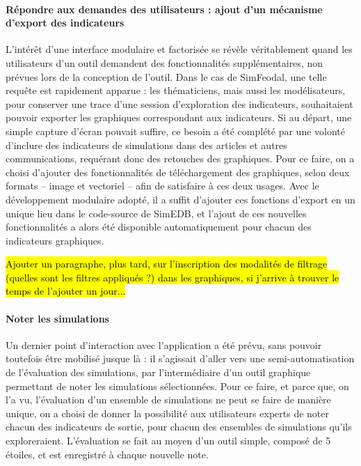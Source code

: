 \paragraph*{Répondre aux demandes des utilisateurs : ajout d'un mécanisme d'export des indicateurs}

L'intérêt d'une interface modulaire et factorisée se révèle véritablement quand les utilisateurs d'un outil demandent des fonctionnalités supplémentaires, non prévues lors de la conception de l'outil.
Dans le cas de SimFeodal, une telle requête est rapidement apparue : les thématiciens, mais aussi les modélisateurs, pour conserver une trace d'une session d'exploration des indicateurs, souhaitaient pouvoir exporter les graphiques correspondant aux indicateurs.
Si au départ, une simple capture d'écran pouvait suffire, ce besoin a été complété par une volonté d'inclure des indicateurs de simulations dans des articles et autres communications, requérant donc des retouches des graphiques.
Pour ce faire, on a choisi d'ajouter des fonctionnalités de téléchargement des graphiques, selon deux formats -- image et vectoriel -- afin de satisfaire à ces deux usages.
Avec le développement modulaire adopté, il a suffit d'ajouter ces fonctions d'export en un unique lieu dans le code-source de SimEDB, et l'ajout de ces nouvelles fonctionnalités a alors été disponible automatiquement pour chacun des indicateurs graphiques.

\medskip
\hl{Ajouter un paragraphe, plus tard, sur l'inscription des modalités de filtrage (quelles sont les filtres appliqués ?) dans les graphiques, si j'arrive à trouver le temps de l'ajouter un jour...}

\paragraph*{Noter les simulations}

Un dernier point d'interaction avec l'application a été prévu, sans pouvoir toutefois être mobilisé jusque là : il s'agissait d'aller vers une semi-automatisation de l'évaluation des simulations, par l'intermédiaire d'un outil graphique permettant de \og noter\fg{} les simulations sélectionnées.
Pour ce faire, et parce que, on l'a vu, l'évaluation d'un ensemble de simulations ne peut se faire de manière unique, on a choisi de donner la possibilité aux utilisateurs experts de noter chacun des indicateurs de sortie, pour chacun des ensembles de simulations qu'ils exploreraient.
L'évaluation se fait au moyen d'un outil simple, composé de 5 \og étoiles\fg{}, et est enregistré à chaque nouvelle note.

